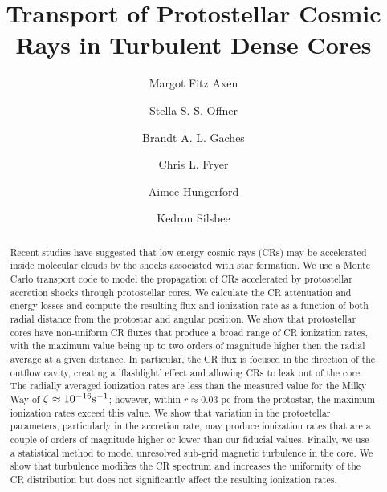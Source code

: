 \documentclass[twocolumn]{aastex63}
\begin{document}
\title{Transport of Protostellar Cosmic Rays in Turbulent Dense Cores}


\author[0000-0001-7220-5193]{Margot Fitz Axen}

\author[0000-0003-1252-9916]{Stella S. S. Offner}

\author[0000-0003-4224-6829]{Brandt A. L. Gaches}

\author[0000-0003-2624-0056]{Chris L. Fryer}

\author{Aimee Hungerford}

\author[0000-0003-1572-0505]{Kedron Silsbee}

\begin{abstract}
    Recent studies have suggested that low-energy cosmic rays (CRs) may be accelerated inside molecular clouds by the shocks associated with star formation. We use a Monte Carlo transport code to model the propagation of CRs accelerated by protostellar accretion shocks through  protostellar cores. We calculate the CR attenuation and energy losses and compute the resulting flux and ionization rate as a function of both radial distance from the protostar and angular position. We show that protostellar cores have non-uniform CR fluxes that produce a broad range of CR ionization rates, with the maximum value being up to two orders of magnitude higher then the radial average at a given distance. In particular, the CR flux is focused in the direction of the outflow cavity, creating a 'flashlight' effect and allowing CRs to leak out of the core. The radially averaged ionization rates are less than the measured value for the Milky Way of $\zeta \approx 10^{-16} \rm s^{-1}$; however, within $r \approx 0.03$ pc from the protostar, the maximum ionization rates exceed this value. We show that variation in the protostellar parameters, particularly in the accretion rate, may produce ionization rates that are a couple of orders of magnitude higher or lower than our fiducial values. Finally, we use a statistical method to model unresolved sub-grid magnetic turbulence in the core. We show that turbulence modifies the CR spectrum and increases the uniformity of the CR distribution but does not significantly affect the resulting ionization rates.
\end{abstract}
\end{document}
